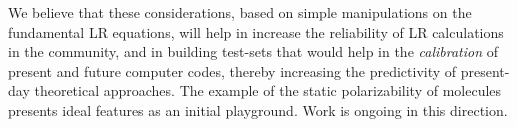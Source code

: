 \documentclass[reprint,aps,prb]{revtex4-1}
\newcommand{\dd}{{\rm d}}
\newcommand{\be}{\begin{equation}}
\newcommand{\ee}{\end{equation}}
\newcommand{\lb}{\label}
\newcommand{\op}[1]{\hat {#1}}
\newcommand{\sop}[1]{\op{\op {#1}}}
\newcommand{\trace}[1]{\mathrm{tr}\left(#1\right)}
\newcommand{\ketbra}[2]{| #1 \rangle \langle #2 |}
\begin{document}


We believe that these considerations, based on simple manipulations on the fundamental LR equations, will help in increase
the reliability of LR calculations in the community, and in building test-sets that would help in
the \emph{calibration} of present and future computer codes, thereby increasing the predictivity of present-day theoretical approaches.
The example of the static polarizability of molecules
presents ideal features as an initial playground. Work is ongoing in this direction.





\end{document}
